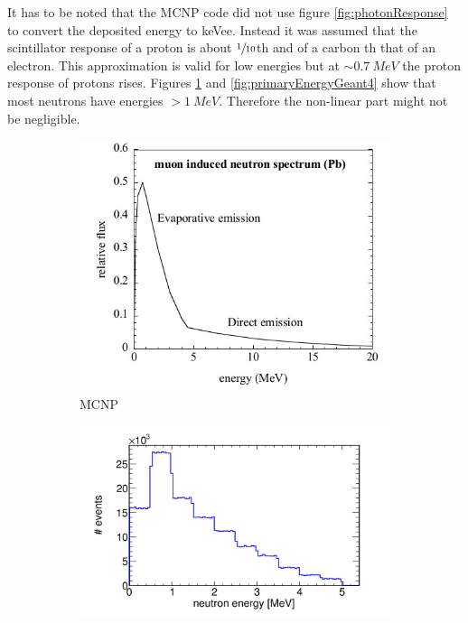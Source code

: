 \documentclass[12pt]{article}
\begin{document}
 It has to be noted that \label{part:eResponse} the MCNP code did not use figure \ref{fig:photonResponse} to convert the deposited energy to keVee. Instead it was assumed that the scintillator response of a proton is about $\sfrac{1}{10}$\hspace{2pt}th and of a carbon \hspace{2pt}th that of an electron. This approximation is valid for low energies but at $\sim\SI{0.7}{MeV}$ the proton response of protons rises. 
 Figures \ref{fig:primaryEnergyMCNP} and \ref{fig:primaryEnergyGeant4} show that most neutrons have energies $>\SI{1}{MeV}$. Therefore the non-linear part might not be negligible.
  \begin{figure}[htbp]
  	  		\centering
  	\begin{subfigure}[t]{0.4\textwidth}
  		\includegraphics[width=\textwidth]{./pics/primaryEnergy_orig.jpg}
  		\caption{MCNP}
  		\label{fig:primaryEnergyMCNP}
  	\end{subfigure}
  	\begin{subfigure}[t]{0.55\textwidth}
  		\includegraphics[width=\textwidth]{./pics/primaryEnergy.jpg}

\end{subfigure}
\end{figure}
\end{document}
